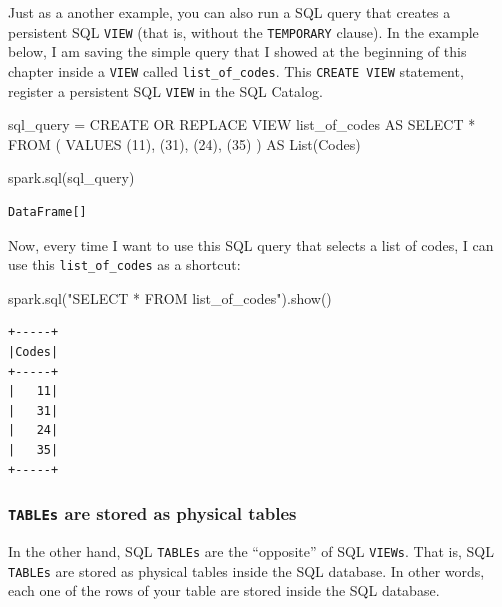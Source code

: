 \documentclass[
  11pt,
  letterpaper,
  DIV=11,
  numbers=noendperiod]{scrreprt}
\newenvironment{Shaded}{\begin{snugshade}}{\end{snugshade}}
\newcommand{\NormalTok}[1]{\textcolor[rgb]{0.00,0.23,0.31}{#1}}
\newcommand{\OperatorTok}[1]{\textcolor[rgb]{0.37,0.37,0.37}{#1}}
\newcommand{\StringTok}[1]{\textcolor[rgb]{0.13,0.47,0.30}{#1}}
\begin{document}
Just as a another example, you can also run a SQL query that creates a
persistent SQL \texttt{VIEW} (that is, without the \texttt{TEMPORARY}
clause). In the example below, I am saving the simple query that I
showed at the beginning of this chapter inside a \texttt{VIEW} called
\texttt{list\_of\_codes}. This \texttt{CREATE\ VIEW} statement, register
a persistent SQL \texttt{VIEW} in the SQL Catalog.

\begin{Shaded}
\begin{Highlighting}[]
\NormalTok{sql\_query }\OperatorTok{=} \StringTok{\textquotesingle{}\textquotesingle{}\textquotesingle{}}
\StringTok{CREATE OR REPLACE VIEW list\_of\_codes AS}
\StringTok{SELECT *}
\StringTok{FROM (}
\StringTok{  VALUES (11), (31), (24), (35)}
\StringTok{) AS List(Codes)}
\StringTok{\textquotesingle{}\textquotesingle{}\textquotesingle{}}

\NormalTok{spark.sql(sql\_query)}
\end{Highlighting}
\end{Shaded}

\begin{verbatim}
DataFrame[]
\end{verbatim}

Now, every time I want to use this SQL query that selects a list of
codes, I can use this \texttt{list\_of\_codes} as a shortcut:

\begin{Shaded}
\begin{Highlighting}[]
\NormalTok{spark.sql(}\StringTok{"SELECT * FROM list\_of\_codes"}\NormalTok{).show()}
\end{Highlighting}
\end{Shaded}

\begin{verbatim}
+-----+
|Codes|
+-----+
|   11|
|   31|
|   24|
|   35|
+-----+
\end{verbatim}

\subsubsection{\texorpdfstring{\texttt{TABLEs} are stored as physical
tables}{TABLEs are stored as physical tables}}\label{tables-are-stored-as-physical-tables}

In the other hand, SQL \texttt{TABLEs} are the ``opposite'' of SQL
\texttt{VIEWs}. That is, SQL \texttt{TABLEs} are stored as physical
tables inside the SQL database. In other words, each one of the rows of
your table are stored inside the SQL database.
\end{document}
